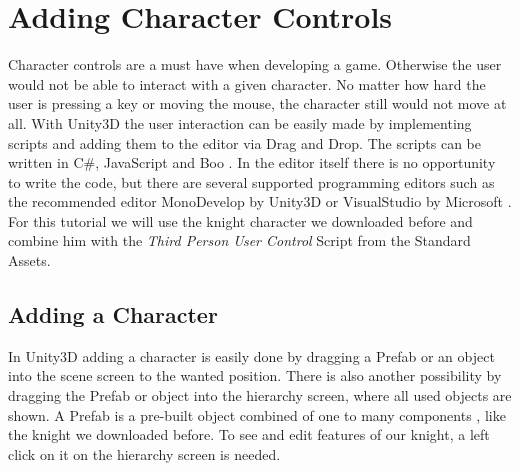 \documentclass[12pt, a4paper, titlepage]{article}
\newcommand{\csh}{C{\#}}
\begin{document}
\section{Adding Character Controls}

Character controls are a must have when developing a game. Otherwise the user would not be able to interact with a given character. No matter how hard the user is pressing a key or moving the mouse, the character still would not move at all.
With Unity3D the user interaction can be easily made by implementing scripts and adding them to the editor via Drag and Drop. The scripts can be written in \csh, JavaScript and Boo \cite{b1}. In the editor itself there is no opportunity to write the code, but there are several supported programming editors such as the recommended editor MonoDevelop by Unity3D or VisualStudio by Microsoft \cite{b1}. \\
For this tutorial we will use the knight character we downloaded before and combine him with the \emph{Third Person User Control} Script from the Standard Assets.

\subsection{Adding a Character}

In Unity3D adding a character is easily done by dragging a Prefab or an object into the scene screen to the wanted position. There is also another possibility by dragging the Prefab or object into the hierarchy screen, where all used objects are shown. A Prefab is a pre-built object combined of one to many components \cite{b2}, like the knight we downloaded before.
To see and edit features of our knight, a left click on it on the hierarchy screen is needed. 
\end{document}
